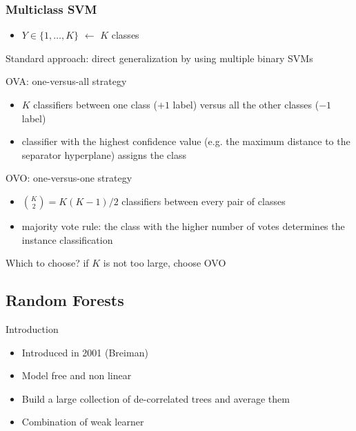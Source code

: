 \begin{frame}
  \frametitle{Multiclass SVM}
  \begin{itemize}
   \item $Y \in \{1,\ldots,K\}$ $\leftarrow$ $K$ classes
  \end{itemize}
   Standard approach: direct generalization by using multiple binary SVMs
   \begin{block}{OVA: one-versus-all strategy}
    \begin{itemize}
    \item $K$ classifiers between one class ($+1$ label) versus all the other classes ($-1$ label)
    \item[\doigt]  classifier with the highest confidence value (e.g. the maximum distance to the separator hyperplane) assigns the class
    \end{itemize}
   \end{block}
   
   
    \begin{block}{OVO: one-versus-one strategy}
    \begin{itemize}
    \item ${K \choose 2} =  K(K-1)/2$ classifiers between every pair of classes
    \item[\doigt] majority vote rule: the class with the higher number of votes determines the instance classification
    \end{itemize}
   \end{block}
   
   Which to choose? if $K$ is not too large, choose OVO

  \end{frame}
  
  
  \subsection{Random Forests}
  \begin{frame}{Introduction}
    \begin{itemize}
    \item Introduced in 2001 (Breiman)
    \item Model free and non linear
    \item Build a large collection of de-correlated trees and average them
    \item Combination of weak learner
    \end{itemize}
  \end{frame}


